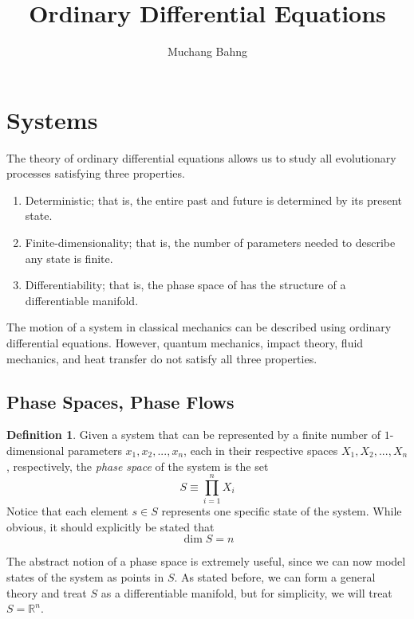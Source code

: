 \documentclass{article}
\theoremstyle{remark}
\theoremstyle{definition}
\newtheorem{definition}{Definition}[section]
\begin{document}
\pagestyle{fancy}

\cfoot{\thepage / \pageref{LastPage}}

\title{Ordinary Differential Equations}
\author{Muchang Bahng}

\maketitle
\tableofcontents
\pagebreak 

\section{Systems}

  The theory of ordinary differential equations allows us to study all evolutionary processes satisfying three properties. 
  \begin{enumerate}
    \item Deterministic; that is, the entire past and future is determined by its present state. 
    \item Finite-dimensionality; that is, the number of parameters needed to describe any state is finite. 
    \item Differentiability; that is, the phase space of has the structure of a differentiable manifold. 
  \end{enumerate}
  The motion of a system in classical mechanics can be described using ordinary differential equations. However, quantum mechanics, impact theory, fluid mechanics, and heat transfer do not satisfy all three properties. 

  \subsection{Phase Spaces, Phase Flows}

    \begin{definition}
      Given a system that can be represented by a finite number of $1$-dimensional parameters $x_1, x_2, ..., x_n$, each in their respective spaces $X_1, X_2, ..., X_n$, respectively, the \textit{phase space} of the system is the set
      \[S \equiv \prod_{i=1}^n X_i\]
      Notice that each element $s \in S$ represents one specific state of the system. While obvious, it should explicitly be stated that 
      \[\dim{S} = n\]
    \end{definition}

    The abstract notion of a phase space is extremely useful, since we can now model states of the system as points in $S$. As stated before, we can form a general theory and treat $S$ as a differentiable manifold, but for simplicity, we will treat $S = \mathbb{R}^n$. 
\end{document}

